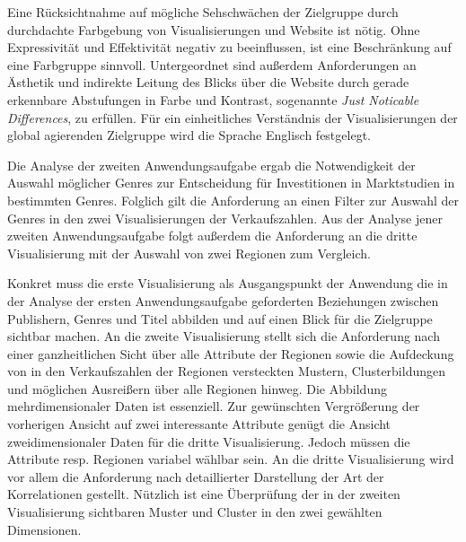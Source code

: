 \documentclass[usegeometry=true]{scrartcl}
\begin{document}
Eine Rücksichtnahme auf mögliche Sehschwächen der Zielgruppe durch durchdachte Farbgebung von Visualisierungen und Website ist nötig. 
Ohne Expressivität und Effektivität negativ zu beeinflussen, ist eine Beschränkung auf eine Farbgruppe sinnvoll. 
Untergeordnet sind außerdem Anforderungen an Ästhetik und indirekte Leitung des Blicks über die Website durch gerade erkennbare Abstufungen in Farbe und Kontrast, 
sogenannte \textit{Just Noticable Differences}, zu erfüllen.
Für ein einheitliches Verständnis der Visualisierungen der global agierenden Zielgruppe wird die Sprache Englisch festgelegt.

Die Analyse der zweiten Anwendungsaufgabe ergab die Notwendigkeit der Auswahl möglicher Genres zur Entscheidung für Investitionen in Marktstudien in bestimmten Genres.
Folglich gilt die Anforderung an einen Filter zur Auswahl der Genres in den zwei Visualisierungen der Verkaufszahlen. 
Aus der Analyse jener zweiten Anwendungsaufgabe folgt außerdem die Anforderung an die dritte Visualisierung mit der Auswahl von zwei Regionen zum Vergleich. 

Konkret muss die erste Visualisierung als Ausgangspunkt der Anwendung die in der Analyse der ersten Anwendungsaufgabe geforderten Beziehungen zwischen Publishern, Genres und Titel abbilden 
und auf einen Blick für die Zielgruppe sichtbar machen.
An die zweite Visualisierung stellt sich die Anforderung nach einer ganzheitlichen Sicht über alle Attribute der Regionen 
sowie die Aufdeckung von in den Verkaufszahlen der Regionen versteckten Mustern, Clusterbildungen und möglichen Ausreißern über alle Regionen hinweg.
Die Abbildung mehrdimensionaler Daten ist essenziell.
Zur gewünschten Vergrößerung der vorherigen Ansicht auf zwei interessante Attribute genügt die Ansicht zweidimensionaler Daten für die dritte Visualisierung.
Jedoch müssen die Attribute resp. Regionen variabel wählbar sein. 
An die dritte Visualisierung wird vor allem die Anforderung nach detaillierter Darstellung der Art der Korrelationen gestellt. 
Nützlich ist eine Überprüfung der in der zweiten Visualisierung sichtbaren Muster und Cluster in den zwei gewählten Dimensionen.
\end{document}
